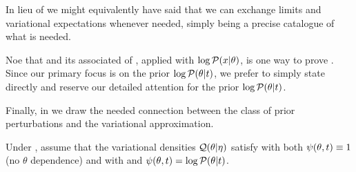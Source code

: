 In lieu of  we might equivalently have said that we can
exchange limits and variational expectations whenever needed,
 simply being a precise catalogue of what is needed.

Noe that  and its associated  of , applied with $\log \mathcal{P}(x \vert \theta)$,
is one way to prove .  Since our primary
focus is on the prior $\log \mathcal{P}(\theta \vert t)$, we prefer to simply state
 directly and reserve our detailed attention
for the prior $\log \mathcal{P}(\theta \vert t)$.

Finally, in  we draw the needed connection between the
class of prior perturbations and the variational approximation.

\begin{assu}
%
Under , assume that the variational densities $\mathcal{Q}(\theta \vert
\eta)$ satisfy  with both $\psi(\theta, t) \equiv 1$ (no
$\theta$ dependence) and with and $\psi(\theta, t) = \log \mathcal{P}(\theta \vert t)$.
%
\end{assu}

